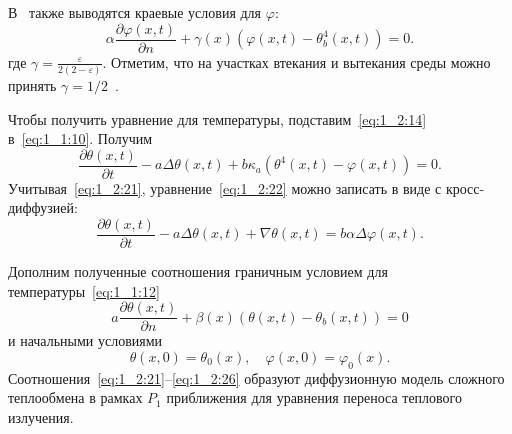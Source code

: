 В~\cite{Kovtanyuk2014a} также выводятся краевые условия для $\varphi$:
\begin{equation}
    \label{eq:1_2:24}
    \alpha \frac{\partial \varphi(x, t)}{\partial n}+
    \gamma(x)\left(\varphi(x, t)-\theta_{b}^{4}(x, t)\right)=0.
\end{equation}
где $\gamma=\frac{\varepsilon}{2(2-\varepsilon)}$.
Отметим, что на участках втекания и вытекания среды
можно принять $\gamma=1/2$~\cite{JVM-14}.


Чтобы получить уравнение для температуры, подставим~\eqref{eq:1_2:14} в~\eqref{eq:1_1:10}.
Получим
\begin{equation}
    \label{eq:1_2:22}
    \frac{\partial \theta(x, t)}{\partial t} - a \Delta \theta(x, t)
    + b \kappa_{a}\left(\theta^{4}(x, t)-\varphi(x, t)\right)=0.
\end{equation}
Учитывая~\eqref{eq:1_2:21}, уравнение~\eqref{eq:1_2:22} можно записать в виде с кросс-диффузией:
\[
    \frac{\partial \theta(x, t)}{\partial t}-a \Delta \theta(x, t)
    + \nabla \theta(x, t) = b \alpha \Delta \varphi(x, t).
\]


Дополним полученные соотношения граничным условием для температуры~\eqref{eq:1_1:12}
\begin{equation}
    \label{eq:1_2:25}
    a \frac{\partial \theta(x, t)}{\partial n}
    +\beta(x)\left(\theta(x, t)-\theta_{b}(x, t)\right)=0
\end{equation}
и начальными условиями
\begin{equation}
    \label{eq:1_2:26}
    \theta(x, 0)=\theta_{0}(x), \quad \varphi(x, 0)=\varphi_{0}(x).
\end{equation}
Соотношения~\eqref{eq:1_2:21}--\eqref{eq:1_2:26}
образуют диффузионную модель сложного теплообмена в рамках
$P_1$ приближения для уравнения переноса теплового излучения.

\FloatBarrier

